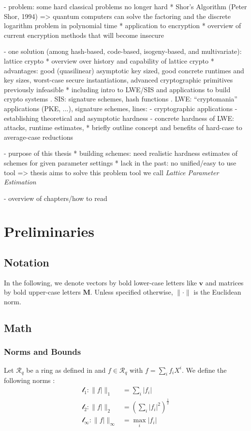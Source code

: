 \documentclass[
  a4paper,  %
  twoside,  %
  bibliography=totoc,
  headsepline,
  cleardoublepage=empty,
  parskip=half,
  draft=false
]{scrbook}
\begin{document}
- problem: some hard classical problems no longer hard
  * Shor's Algorithm (Peter Shor, 1994) %
    => quantum computers can solve the factoring and the discrete logarithm problem in polynomial time
  * application to encryption
  * overview of current encryption methods that will become insecure

- one solution (among hash-based, code-based, isogeny-based, and multivariate): lattice crypto
  * overview over history and capability of lattice crypto
  * advantages: good (quasilinear) asymptotic key sized, good concrete runtimes and key sizes, worst-case secure instantiations, advanced cryptographic primitives previously infeasible
  * including intro to LWE/SIS and applications to build crypto systems
    . SIS: signature schemes, hash functions
    . LWE: ``cryptomania'' applications (PKE, ...), signature schemes, lines:
      - cryptographic applications
      - establishing theoretical and asymptotic hardness \cite{Reg05} %
        \cite{BLPRS13, MP13} 
      - concrete hardness of LWE: attacks, runtime estimates, 
  * briefly outline concept and benefits of hard-case to average-case reductions

- purpose of this thesis
  * building schemes: need realistic hardness estimates of schemes for given parameter settings
  * lack in the past: no unified/easy to use tool => thesis aims to solve this problem
    tool we call \textit{Lattice Parameter Estimation} 

- overview of chapters/how to read



\chapter{Preliminaries} \label{chap:Preliminaries}

\section{Notation}
In the following, we denote vectors by bold lower-case letters like $\textbf{v}$ and matrices by bold upper-case letters $\textbf{M}$. Unless specified otherwise, $\| \cdot \|$ is the Euclidean norm. %


\section{Math} 
\subsection{Norms and Bounds} %
Let $\mathcal{R}_q$ be a ring as defined in \cite{BDLOP18} and $f \in \mathcal{R}_q$ with $f = \sum_i f_i X^i$. We define the following norms \cite{BDLOP18}:
\begin{align}
  \mathcal{l}_1 : \| f| \|_1 &= \sum_i |f_i|\\
  \mathcal{l}_2 : \| f| \|_2 &= \left(\sum_i |f_i|^2\right) ^{\frac{1}{2}}\\
  \mathcal{l}_\infty : \| f| \|_\infty &= \max_i |f_i|
\end{align}
\end{document}
